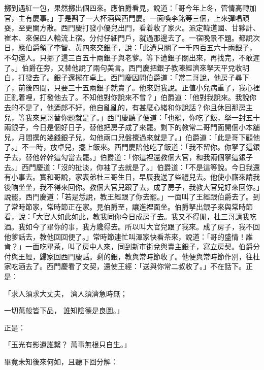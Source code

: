 \begin{showcontents}{}
擲到遇紅一包，果然擲出個四來。應伯爵看見，說道：「哥今年上冬，管情高轉加官，主有慶事。」于是斟了一大杯酒與西門慶。一面喚李銘等三個，上來彈唱頑耍，至更闌方散。西門慶打發小優兒出門，看着收了家火。派定韓道國、甘夥計、崔本、來保四人輪流上宿。分付仔細門戶，就過那邊去了。一宿晚景不題。都說次日，應伯爵領了李智、黃四來交銀子，說：「此遭只關了一千四百五六十兩銀子，不勾還人。只挪了這三百五十兩銀子與老爹。等下遭銀子關出來，再找完，不敢遲了。」伯爵在旁，又替他說了兩句美言。西門慶把銀子教陳經濟來拏天平兌收明白，打發去了。銀子還擺在卓上。西門慶因問伯爵道：「常二哥說，他房子尋下了，前後四間，只要三十五兩銀子就賣了。他來對我說。正值小兒病重了，我心裡正亂着哩，打發他去了。不知他對你說來不曾？」伯爵道：「他對我說來。我說你去的不是了，他迺郎不好，他自亂亂的，有甚麼心緒和你說話？你且休回那房主兒，等我來見哥替你題就是了。」西門慶聽了便道：「也罷，你吃了飯，拏一封五十兩銀子，今日是個好日子，替他把房子成了來罷。剩下的教常二哥門面開個小本舖兒，月間撰的幾錢銀子兒，勾他兩口兒盤攪過來就是了。」伯爵道：「此是哥下顧他了。」不一時，放卓兒，擺上飯來。西門慶陪他吃了飯道：「我不留你。你拏了這銀子去，替他幹幹這勾當去罷。」伯爵道：「你這裡還教個大官，和我兩個拏這銀子去。」西門慶道：「沒的扯淡，你袖了去就是了。」伯爵道：「不是這等說。今日我還有小事去。實和哥說，家表弟杜三哥生日，早辰我送了些禮兒去。他使小廝來請我後晌坐坐，我不得來回你。教個大官兒跟了去，成了房子，我教大官兒好來回你。」說罷，西門慶道：「若是恁說，教王經跟了你去罷。」一面叫了王經跟伯爵去了。到了常時節家，常時節正在家。見伯爵至，讓進裡面坐。伯爵拏出銀子來與常時節看，說：「大官人如此如此，教我同你今日成房子去。我又不得閒，杜三哥請我吃酒。我如今了畢你的事，我方纔得去。所以叫大官兒跟了我來。成了房子，我不回他爹話去，教他回回便了。」常時節連忙叫渾家快看茶來，說道：「哥的盛情！誰肯？」一面吃畢茶，叫了房中人來，同到新市街兌與賣主銀子，寫立房契。伯爵分付與王經，歸家回西門慶話。剩的銀，教與常時節收了。他便與常時節作別，往杜家吃酒去了。西門慶看了文契，還使王經：「送與你常二叔收了。」不在話下。正是：

「求人須求大丈夫，  濟人須濟急時無；

一切萬般皆下品，  誰知陰德是良圖。」

正是：

「玉光有影遺誰繫？  萬事無根只自生。」

畢竟未知後來何如，且聽下回分解：




\end{showcontents}


